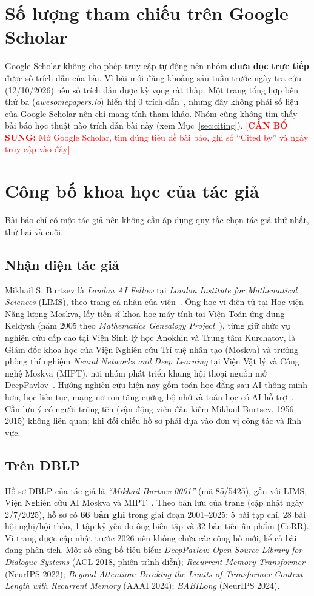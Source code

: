 \documentclass[12pt,a4paper,openany]{report}
\numberwithin{equation}{chapter}   %
\theoremstyle{definition}
\newif\ifdraft \drafttrue          %
\newcommand{\todo}[1]{\ifdraft\textcolor{red}{[\textbf{CẦN BỔ SUNG:} #1]}\fi}
\newcommand{\en}[1]{\textit{#1}}   %
\begin{document}
\section{Số lượng tham chiếu trên Google Scholar}\label{sec:scholarbai}
Google Scholar không cho phép truy cập tự động nên nhóm \textbf{chưa đọc trực tiếp} được số trích dẫn của bài. Vì bài mới đăng khoảng sáu tuần trước ngày tra cứu (12/10/2026) nên số trích dẫn được kỳ vọng rất thấp. Một trang tổng hợp bên thứ ba (\en{awesomepapers.io}) hiển thị 0 trích dẫn~\cite{awesome}, nhưng đây không phải số liệu của Google Scholar nên chỉ mang tính tham khảo. Nhóm cũng không tìm thấy bài báo học thuật nào trích dẫn bài này (xem Mục~\ref{sec:citing}).
\todo{Mở Google Scholar, tìm đúng tiêu đề bài báo, ghi số ``Cited by'' và ngày truy cập vào đây}

\section{Công bố khoa học của tác giả}
Bài báo chỉ có một tác giả nên không cần áp dụng quy tắc chọn tác giả thứ nhất, thứ hai và cuối.

\subsection{Nhận diện tác giả}
Mikhail S. Burtsev là \en{Landau AI Fellow} tại \en{London Institute for Mathematical Sciences} (LIMS), theo trang cá nhân của viện~\cite{lims}. Ông học vi điện tử tại Học viện Năng lượng Moskva, lấy tiến sĩ khoa học máy tính tại Viện Toán ứng dụng Keldysh (năm 2005 theo \en{Mathematics Genealogy Project}~\cite{mgp}), từng giữ chức vụ nghiên cứu cấp cao tại Viện Sinh lý học Anokhin và Trung tâm Kurchatov, là Giám đốc khoa học của Viện Nghiên cứu Trí tuệ nhân tạo (Moskva) và trưởng phòng thí nghiệm \en{Neural Networks and Deep Learning} tại Viện Vật lý và Công nghệ Moskva (MIPT), nơi nhóm phát triển khung hội thoại nguồn mở DeepPavlov~\cite{lims}. Hướng nghiên cứu hiện nay gồm toán học đằng sau AI thông minh hơn, học liên tục, mạng nơ-ron tăng cường bộ nhớ và toán học có AI hỗ trợ~\cite{lims}. Cần lưu ý có người trùng tên (vận động viên đấu kiếm Mikhail Burtsev, 1956--2015) không liên quan; khi đối chiếu hồ sơ phải dựa vào đơn vị công tác và lĩnh vực.

\subsection{Trên DBLP}
Hồ sơ DBLP của tác giả là \en{``Mikhail Burtsev 0001''} (mã 85/5425), gắn với LIMS, Viện Nghiên cứu AI Moskva và MIPT~\cite{dblp}. Theo bản lưu của trang (cập nhật ngày 2/7/2025), hồ sơ có \textbf{66 bản ghi} trong giai đoạn 2001--2025: 5 bài tạp chí, 28 bài hội nghị/hội thảo, 1 tập kỷ yếu do ông biên tập và 32 bản tiền ấn phẩm (CoRR). Vì trang được cập nhật trước 2026 nên không chứa các công bố mới, kể cả bài đang phân tích. Một số công bố tiêu biểu: \en{DeepPavlov: Open-Source Library for Dialogue Systems} (ACL 2018, phiên trình diễn); \en{Recurrent Memory Transformer} (NeurIPS 2022); \en{Beyond Attention: Breaking the Limits of Transformer Context Length with Recurrent Memory} (AAAI 2024); \en{BABILong} (NeurIPS 2024).
\end{document}
